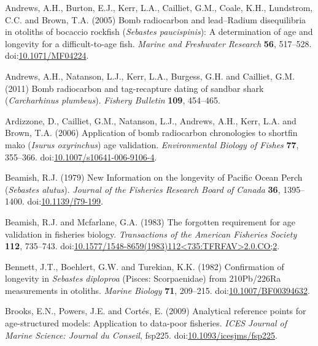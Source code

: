 \documentclass[]{article}
\begin{document}
\hypertarget{ref-andrews_bomb_2005}{}
Andrews, A.H., Burton, E.J., Kerr, L.A., Cailliet, G.M., Coale, K.H.,
Lundstrom, C.C. and Brown, T.A. (2005) Bomb radiocarbon and lead--Radium
disequilibria in otoliths of bocaccio rockfish (\emph{Sebastes
paucispinis}): A determination of age and longevity for a
difficult-to-age fish. \emph{Marine and Freshwater Research}
\textbf{56}, 517--528.
doi:\href{https://doi.org/10.1071/MF04224}{10.1071/MF04224}.

\hypertarget{ref-andrews_bomb_2011}{}
Andrews, A.H., Natanson, L.J., Kerr, L.A., Burgess, G.H. and Cailliet,
G.M. (2011) Bomb radiocarbon and tag-recapture dating of sandbar shark
(\emph{Carcharhinus plumbeus}). \emph{Fishery Bulletin} \textbf{109},
454--465.

\hypertarget{ref-ardizzone_application_2006}{}
Ardizzone, D., Cailliet, G.M., Natanson, L.J., Andrews, A.H., Kerr, L.A.
and Brown, T.A. (2006) Application of bomb radiocarbon chronologies to
shortfin mako (\emph{Isurus oxyrinchus}) age validation.
\emph{Environmental Biology of Fishes} \textbf{77}, 355--366.
doi:\href{https://doi.org/10.1007/s10641-006-9106-4}{10.1007/s10641-006-9106-4}.

\hypertarget{ref-beamish_new_1979}{}
Beamish, R.J. (1979) New Information on the longevity of Pacific Ocean
Perch (\emph{Sebastes alutus}). \emph{Journal of the Fisheries Research
Board of Canada} \textbf{36}, 1395--1400.
doi:\href{https://doi.org/10.1139/f79-199}{10.1139/f79-199}.

\hypertarget{ref-beamish_forgotten_1983}{}
Beamish, R.J. and Mcfarlane, G.A. (1983) The forgotten requirement for
age validation in fisheries biology. \emph{Transactions of the American
Fisheries Society} \textbf{112}, 735--743.
doi:\href{https://doi.org/10.1577/1548-8659(1983)112\%3C735:TFRFAV\%3E2.0.CO;2}{10.1577/1548-8659(1983)112\textless{}735:TFRFAV\textgreater{}2.0.CO;2}.

\hypertarget{ref-bennett_confirmation_1982}{}
Bennett, J.T., Boehlert, G.W. and Turekian, K.K. (1982) Confirmation of
longevity in \emph{Sebastes diploproa} (Pisces: Scorpaenidae) from
210Pb/226Ra measurements in otoliths. \emph{Marine Biology} \textbf{71},
209--215.
doi:\href{https://doi.org/10.1007/BF00394632}{10.1007/BF00394632}.

\hypertarget{ref-brooks_analytical_2009}{}
Brooks, E.N., Powers, J.E. and Cortés, E. (2009) Analytical reference
points for age-structured models: Application to data-poor fisheries.
\emph{ICES Journal of Marine Science: Journal du Conseil}, fsp225.
doi:\href{https://doi.org/10.1093/icesjms/fsp225}{10.1093/icesjms/fsp225}.
\end{document}
